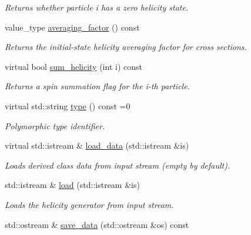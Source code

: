\begin{DoxyCompactItemize}
\begin{DoxyCompactList}\small\item\em Returns whether particle i has a zero helicity state. \end{DoxyCompactList}\item 
\hypertarget{a00267_a47689b9dfa69a269bd103e9b2e5fd0ad}{value\-\_\-type \hyperlink{a00267_a47689b9dfa69a269bd103e9b2e5fd0ad}{averaging\-\_\-factor} () const }\label{a00267_a47689b9dfa69a269bd103e9b2e5fd0ad}

\begin{DoxyCompactList}\small\item\em Returns the initial-\/state helicity averaging factor for cross sections. \end{DoxyCompactList}\item 
virtual bool \hyperlink{a00267_ab8d236622fd171df60d0b733d1ae1720}{sum\-\_\-helicity} (int i) const 
\begin{DoxyCompactList}\small\item\em Returns a spin summation flag for the i-\/th particle. \end{DoxyCompactList}\item 
\hypertarget{a00267_a32fbc77c747b6af90230ea0f26123ccc}{virtual std\-::string \hyperlink{a00267_a32fbc77c747b6af90230ea0f26123ccc}{type} () const =0}\label{a00267_a32fbc77c747b6af90230ea0f26123ccc}

\begin{DoxyCompactList}\small\item\em Polymorphic type identifier. \end{DoxyCompactList}\item 
\hypertarget{a00267_ae3135a78d6e831ccaf76e280e90bef1d}{virtual std\-::istream \& \hyperlink{a00267_ae3135a78d6e831ccaf76e280e90bef1d}{load\-\_\-data} (std\-::istream \&is)}\label{a00267_ae3135a78d6e831ccaf76e280e90bef1d}

\begin{DoxyCompactList}\small\item\em Loads derived class data from input stream (empty by default). \end{DoxyCompactList}\item 
\hypertarget{a00267_afc6ff51f7fd97967009df82c859bb9b1}{std\-::istream \& \hyperlink{a00267_afc6ff51f7fd97967009df82c859bb9b1}{load} (std\-::istream \&is)}\label{a00267_afc6ff51f7fd97967009df82c859bb9b1}

\begin{DoxyCompactList}\small\item\em Loads the helicity generator from input stream. \end{DoxyCompactList}\item 
\hypertarget{a00267_a083996244a1a5d41bb7a4a6648aa77be}{std\-::ostream \& \hyperlink{a00267_a083996244a1a5d41bb7a4a6648aa77be}{save\-\_\-data} (std\-::ostream \&os) const }\label{a00267_a083996244a1a5d41bb7a4a6648aa77be}


\end{DoxyCompactItemize}
